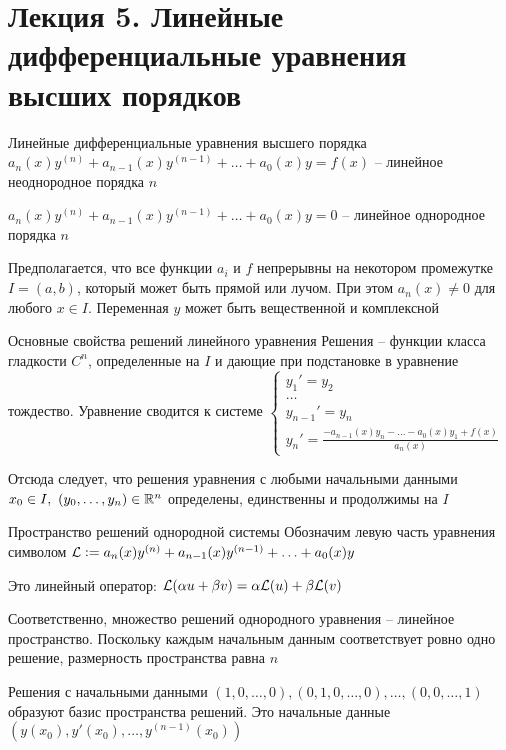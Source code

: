\documentclass[12pt]{article}
\begin{document}
\newpage

\section{Лекция 5. Линейные дифференциальные уравнения высших порядков}

\begin{defin}{Линейные дифференциальные уравнения высшего порядка}
    $a_n(x)y^{(n)} + a_{n - 1}(x)y^{(n - 1)} + \ldots + a_0(x)y = f(x)$ -- линейное неоднородное порядка $n$

    $a_n(x)y^{(n)} + a_{n - 1}(x)y^{(n - 1)} + \ldots + a_0(x)y = 0$ -- линейное однородное порядка $n$

    Предполагается, что все функции $a_i$ и $f$ непрерывны на некотором промежутке $I = (a, b)$, который может быть прямой или лучом. При этом $a_n(x) \neq 0$ для любого $x \in I$. Переменная $y$ может быть вещественной и комплексной
\end{defin}

\begin{theo}{Основные свойства решений линейного уравнения}
    Решения -- функции класса гладкости $C^n$, определенные на $I$ и дающие при подстановке в уравнение тождество. Уравнение сводится к системе $\begin{cases}
        y_1' = y_2 \\
        \ldots \\
        y_{n - 1}' = y_n \\
        y_n' = \frac{-a_{n - 1}(x)y_n - \ldots - a_0(x)y_1 + f(x)}{a_n(x)}
    \end{cases}$

    Отсюда следует, что решения уравнения с любыми начальными данными $x_0 \in I,\ (y_0, \ldots, y_n) \in \mathbb R^n$ определены, единственны и продолжимы на $I$
\end{theo}

\begin{defin}{Пространство решений однородной системы}
    Обозначим левую часть уравнения символом $\mathcal{L} := a_n(x)y^{(n)} + a_{n - 1}(x)y^{(n - 1)} + \ldots + a_0(x)y$

    Это линейный оператор: $\mathcal{L}(\alpha u + \beta v) = \alpha \mathcal{L}(u) + \beta \mathcal{L}(v)$

    Соответственно, множество решений однородного уравнения -- линейное пространство. Поскольку каждым начальным данным соответствует ровно одно решение, размерность пространства равна $n$

    Решения с начальными данными $(1, 0, \ldots, 0), (0, 1, 0, \ldots, 0), \ldots, (0, 0, \ldots, 1)$ образуют базис пространства решений. Это начальные данные $(y(x_0), y'(x_0), \ldots, y^{(n - 1)}(x_0))$
\end{defin}
\end{document}
